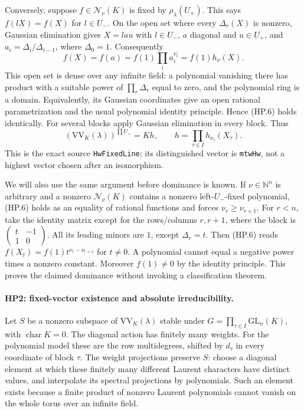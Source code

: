 Conversely, suppose $f\in\mathcal N_\nu(K)$ is fixed by
$\rho_\lambda(U_+)$.  This says $f(lX)=f(X)$ for $l\in U_-$.
On the open set where every $\Delta_r(X)$ is nonzero, Gaussian
elimination gives $X=l a u$ with $l\in U_-$, $a$ diagonal and
$u\in U_+$, and $a_i=\Delta_i/\Delta_{i-1}$, where $\Delta_0=1$.
Consequently
\[
 f(X)=f(a)=f(1)\prod_i a_i^{\nu_i}
                =f(1)h_\nu(X).                    \tag{HP.6}
\]
This open set is dense over any infinite field: a polynomial vanishing
there has product with a suitable power of $\prod_r\Delta_r$ equal
to zero, and the polynomial ring is a domain.  Equivalently, its
Gaussian coordinates give an open rational parametrization and the
usual polynomial identity principle.  Hence (HP.6) holds identically.
For several blocks apply Gaussian elimination in every block.  Thus
\[
 (\mathrm{VV}_K(\lambda))^{\prod U_+}
       =K h,\qquad h=\prod_{\tau\in I}h_{\nu_\tau}(X_\tau).
 \tag{HP.7}
\]
This is the exact source \texttt{HwFixedLine}; its distinguished vector
is \texttt{mtwHw}, not a highest vector chosen after an isomorphism.

We will also use the same argument before dominance is known.
If $\nu\in\mathbb N^n$ is arbitrary and a nonzero
$\mathcal N_\nu(K)$ contains a nonzero left-$U_-$-fixed polynomial,
(HP.6) holds as an equality of rational functions and forces
$\nu_r\ge\nu_{r+1}$.  For $r<n$, take the identity matrix except
for the rows/columns $r,r+1$, where the block is
$\left(\begin{smallmatrix}t&-1\\1&0\end{smallmatrix}\right)$.
All its leading minors are $1$, except $\Delta_r=t$.
Then (HP.6) reads $f(X_t)=f(1)t^{\nu_r-\nu_{r+1}}$ for $t\ne0$.
A polynomial cannot equal a negative power times a nonzero constant.
Moreover $f(1)\ne0$ by the identity principle.  This proves the claimed
dominance without invoking a classification theorem.

\paragraph{HP2: fixed-vector existence and absolute irreducibility.}
\label{claim:HP2}
Let $S$ be a nonzero subspace of $\mathrm{VV}_K(\lambda)$ stable under
$G=\prod_{\tau\in I}\mathrm{GL}_n(K)$, with $\operatorname{char}K=0$.
The diagonal action has finitely many weights.  For the polynomial
model these are the row multidegrees, shifted by $d_\tau$ in every
coordinate of block $\tau$.  The weight projections preserve $S$:
choose a diagonal element at which these finitely many different
Laurent characters have distinct values, and interpolate its spectral
projections by polynomials.  Such an element exists because a finite
product of nonzero Laurent polynomials cannot vanish on the whole
torus over an infinite field.

